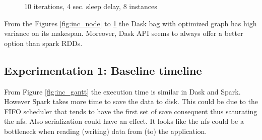 \documentclass[11pt,a4paper]{article}
\begin{document}
\begin{figure}[htp]
    \centering
    
    \caption{10 iterations, 4 sec. sleep delay, 8 instances}
    \label{fig:inc_chunk}
\end{figure}

From the Figures \ref{fig:inc_node} to \ref{fig:inc_chunk} the Dask bag with optimized graph
has high variance on its makespan. Moreover, Dask API seems to always offer a better
option than spark RDDs.

\subsection{Experimentation 1: Baseline timeline}
From Figure \ref{fig:inc_gantt} the execution time
is similar in Dask and Spark. However Spark takes more time to save the data to disk.
This could be due to the FIFO scheduler that tends to have the first set of save
consequent thus saturating the nfs. Also serialization could have an effect. It looks
like the nfs could be a bottleneck when reading (writing) data from (to) the
application.
\end{document}
